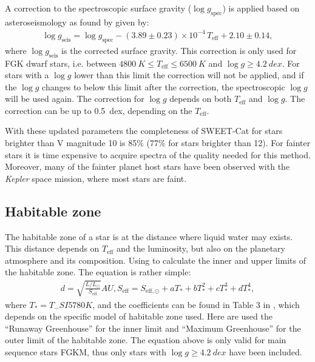 A correction to the spectroscopic surface gravity ($\log g_\mathrm{spec}$) is applied based on
asteroseismology as found by \citet{Mortier2014} given by:
\begin{align}
  \log g_\mathrm{seis} = \log g_\mathrm{spec} - (3.89\pm0.23)\times 10^{-4}\,T_\mathrm{eff}+2.10\pm0.14,
\end{align}
where $\log g_\mathrm{seis}$ is the corrected surface gravity. This correction is only used for FGK
dwarf stars, i.e. between $\SI{4800}{K}\leq T_\mathrm{eff}\leq\SI{6500}{K}$ and $\log
g\geq\SI{4.2}{dex}$. For stars with a $\log g$ lower than this limit the correction will not be
applied, and if the $\log g$ changes to below this limit after the correction, the spectroscopic
$\log g$ will be used again. The correction for $\log g$ depends on both $T_\mathrm{eff}$ and $\log
g$. The correction can be up to \SI{0.5}{dex}, depending on the $T_\mathrm{eff}$.

With these updated parameters the completeness of SWEET-Cat for stars brighter than V magnitude 10
is 85\% (77\% for stars brighter than 12). For fainter stars it is time expensive to acquire spectra
of the quality needed for this method. Moreover, many of the fainter planet host stars have been
observed with the \emph{Kepler} space mission, where most stars are faint.


\subsection{Habitable zone}
\label{sec:HZ}

The habitable zone of a star is at the distance where liquid water may exists. This distance depends
on $T_\mathrm{eff}$ and the luminosity, but also on the planetary atmosphere and its composition.
Using \citet[equation 3 described in][]{Kopparapu2013} to calculate the inner and upper limits of
the habitable zone. The equation is rather simple:
\begin{align}
 d = \sqrt{\frac{L/L_\odot}{S_\mathrm{eff}}} \si{AU},
 S_\mathrm{eff} = S_{\mathrm{eff},\odot} + aT_\ast + bT_\ast^2 + cT_\ast^3 + dT_\ast^4,
\end{align}
where $T_\ast=T_\mathrm-SI{5780}{K}$, and the coefficients can be found in Table 3 in
\citet{Kopparapu2013}, which depends on the specific model of habitable zone used. Here are used the
``Runaway Greenhouse'' for the inner limit and ``Maximum Greenhouse'' for the outer limit of the
habitable zone. The equation above is only valid for main sequence stars FGKM, thus only stars with
$\log g\geq\SI{4.2}{dex}$ have been included.


